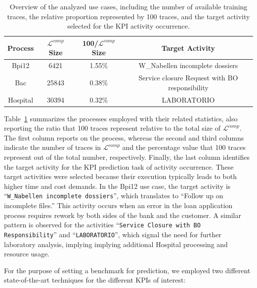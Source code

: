 \documentclass[manuscript,screen,review]{acmart}
\newcommand{\ML}{\mathcal{L}}
\begin{document}
\begin{table}[t]
    \centering
    \begin{tabular}{|c|c|c|c|}\hline
        \textbf{Process} & \textbf{$\ML^{comp}$ Size}  & \textbf{100/$\ML^{comp}$ Size}  & \textbf{Target Activity} \\\hline
         Bpi12&  6421 & 1.55\%&  W\_Nabellen incomplete dossiers\\\hline
         Bac & 25843 & 0.38\%& Service closure Request with BO responsibility\\\hline
         Hospital &  30394&  0.32\%& LABORATORIO\\ \hline
    \end{tabular}
    \caption{Overview of the analyzed use cases, including the number of available training traces, the relative proportion represented by 100 traces, and the target activity selected for the KPI activity occurrence.}
    \label{tab:use_cases}
\end{table}



Table~\ref{tab:use_cases} summarizes the processes employed with their related statistics, also reporting the ratio that 100 traces represent relative to the total size of $\ML^{comp}$. The first column reports on the process, whereas the second and third columns indicate the number of traces in $\ML^{comp}$ and the percentage value that 100 traces represent out of the total number, respectively. Finally, the last column identifies the target activity for the KPI prediction task of activity occurrence. These target activities were selected because their execution typically leads to both higher time and cost demands. In the Bpi12 use case, the target activity is “\texttt{W\_Nabellen incomplete dossiers}”, which translates to “Follow up on incomplete files.” This activity occurs when an error in the loan application process requires rework by both sides of the bank and the customer. A similar pattern is observed for the activities “\texttt{Service Closure with BO Responsibility}” and “\texttt{LABORATORIO}”, which signal the need for further laboratory analysis, implying implying additional Hospital processing and resource usage.

\noindent
For the purpose of setting a benchmark for prediction, we employed two different state-of-the-art techniques for the different KPIs of interest:
\end{document}
